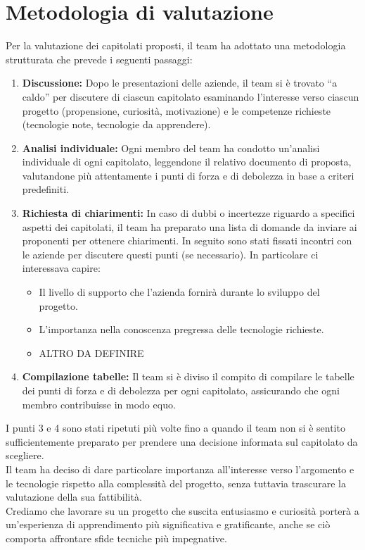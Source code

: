 \documentclass[a4paper,11pt]{article}
\begin{document}
\newpage
\tableofcontents

\newpage
\section{Metodologia di valutazione}
Per la valutazione dei capitolati proposti, il team ha adottato una metodologia strutturata che prevede i seguenti passaggi:
\begin{enumerate}
\item \textbf{Discussione:} Dopo le presentazioni delle aziende, il team si è trovato ``a caldo'' per discutere di ciascun capitolato esaminando l'interesse verso ciascun progetto (propensione, curiosità, motivazione) e le competenze richieste (tecnologie note, tecnologie da apprendere).
\item \textbf{Analisi individuale:} Ogni membro del team ha condotto un'analisi individuale di ogni capitolato, leggendone il relativo documento di proposta, valutandone più attentamente i punti di forza e di debolezza in base a criteri predefiniti.
\item \textbf{Richiesta di chiarimenti:} In caso di dubbi o incertezze riguardo a specifici aspetti dei capitolati, il team ha preparato una lista di domande da inviare ai proponenti per ottenere chiarimenti. In seguito sono stati fissati incontri con le aziende per discutere questi punti (se necessario).
  In particolare ci interessava capire:
  \begin{itemize}
    \item Il livello di supporto che l'azienda fornirà durante lo sviluppo del progetto.
    \item L'importanza nella conoscenza pregressa delle tecnologie richieste.
    \item ALTRO DA DEFINIRE
  \end{itemize}
\item \textbf{Compilazione tabelle:} Il team si è diviso il compito di compilare le tabelle dei punti di forza e di debolezza per ogni capitolato, assicurando che ogni membro contribuisse in modo equo.
\end{enumerate}
I punti 3 e 4 sono stati ripetuti più volte fino a quando il team non si è sentito sufficientemente preparato per prendere una decisione informata sul capitolato da scegliere.\\
Il team ha deciso di dare particolare importanza all'interesse verso l'argomento e le tecnologie rispetto alla complessità del progetto, senza tuttavia trascurare la valutazione della sua fattibilità.\\
Crediamo che lavorare su un progetto che suscita entusiasmo e curiosità porterà a un'esperienza di apprendimento più significativa e gratificante, anche se ciò comporta affrontare sfide tecniche più impegnative.
\end{document}
